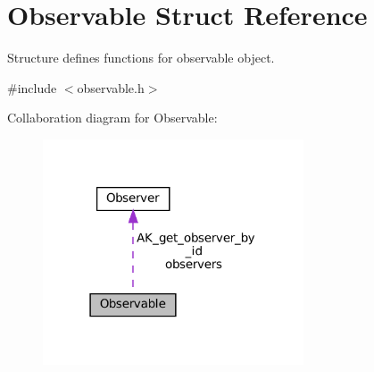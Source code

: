 \hypertarget{structObservable}{}\section{Observable Struct Reference}
\label{structObservable}


Structure defines functions for observable object.  




{\ttfamily \#include $<$observable.\+h$>$}



Collaboration diagram for Observable\+:\nopagebreak
\begin{figure}[H]
\begin{center}
\leavevmode
\includegraphics[width=219pt]{structObservable__coll__graph}
\end{center}
\end{figure}
